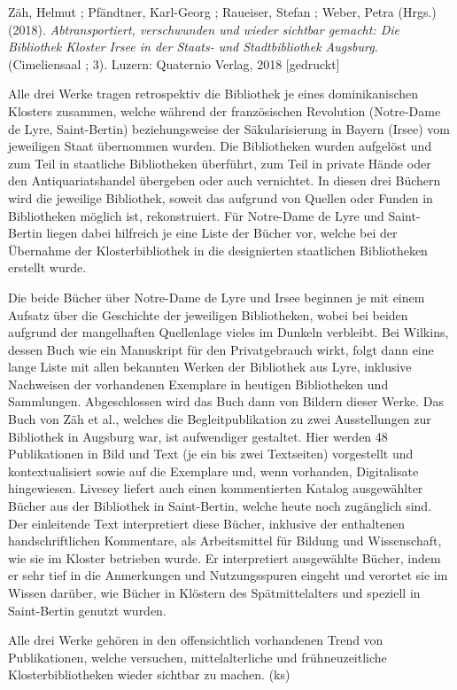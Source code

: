 \documentclass[a4paper,
fontsize=11pt,
oneside,
numbers=noperiodatend,
parskip=half-,
bibliography=totoc,
final
]{scrartcl}
\begin{document}
Zäh, Helmut ; Pfändtner, Karl-Georg ; Raueiser, Stefan ; Weber, Petra
(Hrgs.) (2018). \emph{Abtransportiert, verschwunden und wieder sichtbar
gemacht: Die Bibliothek Kloster Irsee in der Staats- und Stadtbibliothek
Augsburg.} (Cimeliensaal ; 3). Luzern: Quaternio Verlag, 2018
{[}gedruckt{]}

Alle drei Werke tragen retrospektiv die Bibliothek je eines
dominikanischen Klosters zusammen, welche während der französischen
Revolution (Notre-Dame de Lyre, Saint-Bertin) beziehungsweise der
Säkularisierung in Bayern (Irsee) vom jeweiligen Staat übernommen
wurden. Die Bibliotheken wurden aufgelöst und zum Teil in staatliche
Bibliotheken überführt, zum Teil in private Hände oder den
Antiquariatshandel übergeben oder auch vernichtet. In diesen drei
Büchern wird die jeweilige Bibliothek, soweit das aufgrund von Quellen
oder Funden in Bibliotheken möglich ist, rekonstruiert. Für Notre-Dame
de Lyre und Saint-Bertin liegen dabei hilfreich je eine Liste der Bücher
vor, welche bei der Übernahme der Klosterbibliothek in die designierten
staatlichen Bibliotheken erstellt wurde.

Die beide Bücher über Notre-Dame de Lyre und Irsee beginnen je mit einem
Aufsatz über die Geschichte der jeweiligen Bibliotheken, wobei bei
beiden aufgrund der mangelhaften Quellenlage vieles im Dunkeln
verbleibt. Bei Wilkins, dessen Buch wie ein Manuskript für den
Privatgebrauch wirkt, folgt dann eine lange Liste mit allen bekannten
Werken der Bibliothek aus Lyre, inklusive Nachweisen der vorhandenen
Exemplare in heutigen Bibliotheken und Sammlungen. Abgeschlossen wird
das Buch dann von Bildern dieser Werke. Das Buch von Zäh et al., welches
die Begleitpublikation zu zwei Ausstellungen zur Bibliothek in Augsburg
war, ist aufwendiger gestaltet. Hier werden 48 Publikationen in Bild und
Text (je ein bis zwei Textseiten) vorgestellt und kontextualisiert sowie
auf die Exemplare und, wenn vorhanden, Digitalisate hingewiesen. Livesey
liefert auch einen kommentierten Katalog ausgewählter Bücher aus der
Bibliothek in Saint-Bertin, welche heute noch zugänglich sind. Der
einleitende Text interpretiert diese Bücher, inklusive der enthaltenen
handschriftlichen Kommentare, als Arbeitsmittel für Bildung und
Wissenschaft, wie sie im Kloster betrieben wurde. Er interpretiert
ausgewählte Bücher, indem er sehr tief in die Anmerkungen und
Nutzungsspuren eingeht und verortet sie im Wissen darüber, wie Bücher in
Klöstern des Spätmittelalters und speziell in Saint-Bertin genutzt
wurden.

Alle drei Werke gehören in den offensichtlich vorhandenen Trend von
Publikationen, welche versuchen, mittelalterliche und frühneuzeitliche
Klosterbibliotheken wieder sichtbar zu machen. (ks)
\end{document}
